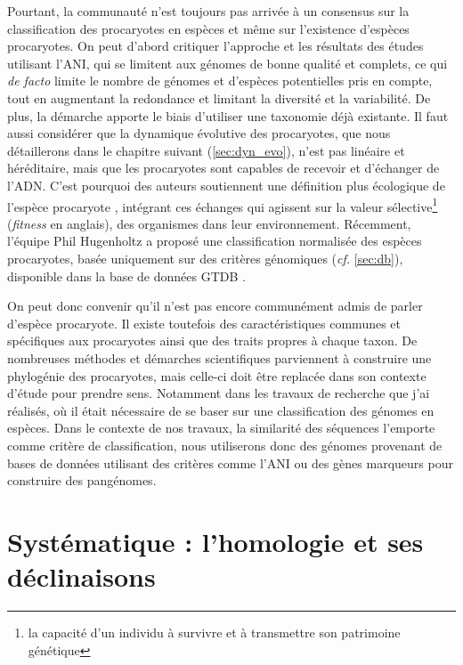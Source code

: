 Pourtant, la communauté n'est toujours pas arrivée à un consensus sur la classification des procaryotes en espèces et même sur l'existence d'espèces procaryotes. On peut d'abord critiquer l'approche et les résultats des études utilisant l'ANI, qui se limitent aux génomes de bonne qualité et complets, ce qui \textit{de facto} limite le nombre de génomes et d'espèces potentielles pris en compte, tout en augmentant la redondance et limitant la diversité et la variabilité. De plus, la démarche apporte le biais d'utiliser une taxonomie déjà existante. Il faut aussi considérer que la dynamique évolutive des procaryotes, que nous détaillerons dans le chapitre suivant (\autoref{sec:dyn_evo}), n'est pas linéaire et héréditaire, mais que les procaryotes sont capables de recevoir et d'échanger de l'ADN. C'est pourquoi des auteurs soutiennent une définition plus écologique de l'espèce procaryote \cite{luo_genome_2011}, intégrant ces échanges qui agissent sur la valeur sélective\footnote{la capacité d'un individu à survivre et à transmettre son patrimoine génétique} (\textit{fitness} en anglais), des organismes dans leur environnement. Récemment, l'équipe Phil Hugenholtz a proposé une classification normalisée des espèces procaryotes, basée uniquement sur des critères génomiques (\textit{cf.} \autoref{sec:db}), disponible dans la base de données GTDB \cite{parks_standardized_2018}.

On peut donc convenir qu'il n'est pas encore communément admis de parler d'espèce procaryote. Il existe toutefois des caractéristiques communes et spécifiques aux procaryotes ainsi que des traits propres à chaque taxon. De nombreuses méthodes et démarches scientifiques parviennent à construire une phylogénie des procaryotes, mais celle-ci doit être replacée dans son contexte d'étude pour prendre sens. Notamment dans les travaux de recherche que j'ai réalisés, où il était nécessaire de se baser sur une classification des génomes en espèces. Dans le contexte de nos travaux, la similarité des séquences l'emporte comme critère de classification, nous utiliserons donc des génomes provenant de bases de données utilisant des critères comme l'ANI ou des gènes marqueurs pour construire des pangénomes.

\section{Systématique : l'homologie et ses déclinaisons}

